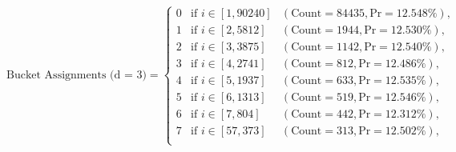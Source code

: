 \renewcommand{\arraystretch}{1.25}
\[
\text{Bucket Assignments (d = 3)} = \left\{
\begin{array}{lll}
    0 & \text{if } i \in [1, 90240] & (\text{Count} = 84435, \text{Pr} = 12.548\%), \\
    1 & \text{if } i \in [2, 5812] & (\text{Count} = 1944, \text{Pr} = 12.530\%), \\
    2 & \text{if } i \in [3, 3875] & (\text{Count} = 1142, \text{Pr} = 12.540\%), \\
    3 & \text{if } i \in [4, 2741] & (\text{Count} = 812, \text{Pr} = 12.486\%), \\
    4 & \text{if } i \in [5, 1937] & (\text{Count} = 633, \text{Pr} = 12.535\%), \\
    5 & \text{if } i \in [6, 1313] & (\text{Count} = 519, \text{Pr} = 12.546\%), \\
    6 & \text{if } i \in [7, 804] & (\text{Count} = 442, \text{Pr} = 12.312\%), \\
    7 & \text{if } i \in [57, 373] & (\text{Count} = 313, \text{Pr} = 12.502\%), \\
\end{array}
\right.
\]



